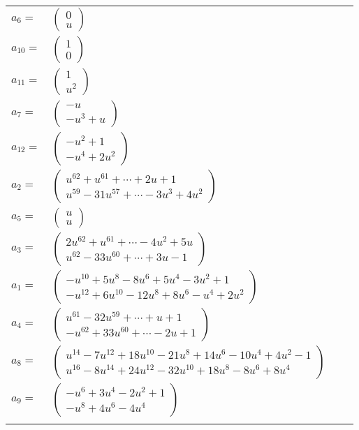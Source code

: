 \documentclass[1p]{elsarticle_modified}
\theoremstyle{definition}
\begin{document}
\begin{tabular}{m{7pt} m{180pt} m{7pt} m{180pt} }
\flushright $a_{6}=$&$\begin{pmatrix}0\\u\end{pmatrix}$ \\
\flushright $a_{10}=$&$\begin{pmatrix}1\\0\end{pmatrix}$ \\
\flushright $a_{11}=$&$\begin{pmatrix}1\\u^2\end{pmatrix}$ \\
\flushright $a_{7}=$&$\begin{pmatrix}- u\\- u^3+u\end{pmatrix}$ \\
\flushright $a_{12}=$&$\begin{pmatrix}- u^2+1\\- u^4+2 u^2\end{pmatrix}$ \\
\flushright $a_{2}=$&$\begin{pmatrix}u^{62}+u^{61}+\cdots+2 u+1\\u^{59}-31 u^{57}+\cdots-3 u^3+4 u^2\end{pmatrix}$ \\
\flushright $a_{5}=$&$\begin{pmatrix}u\\u\end{pmatrix}$ \\
\flushright $a_{3}=$&$\begin{pmatrix}2 u^{62}+u^{61}+\cdots-4 u^2+5 u\\u^{62}-33 u^{60}+\cdots+3 u-1\end{pmatrix}$ \\
\flushright $a_{1}=$&$\begin{pmatrix}- u^{10}+5 u^8-8 u^6+5 u^4-3 u^2+1\\- u^{12}+6 u^{10}-12 u^8+8 u^6- u^4+2 u^2\end{pmatrix}$ \\
\flushright $a_{4}=$&$\begin{pmatrix}u^{61}-32 u^{59}+\cdots+u+1\\- u^{62}+33 u^{60}+\cdots-2 u+1\end{pmatrix}$ \\
\flushright $a_{8}=$&$\begin{pmatrix}u^{14}-7 u^{12}+18 u^{10}-21 u^8+14 u^6-10 u^4+4 u^2-1\\u^{16}-8 u^{14}+24 u^{12}-32 u^{10}+18 u^8-8 u^6+8 u^4\end{pmatrix}$ \\
\flushright $a_{9}=$&$\begin{pmatrix}- u^6+3 u^4-2 u^2+1\\- u^8+4 u^6-4 u^4\end{pmatrix}$\\&\end{tabular}
\end{document}
